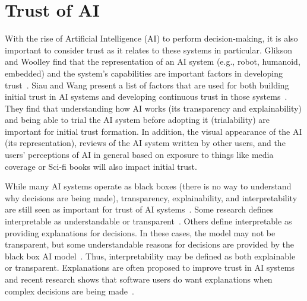 \documentclass{article}
\newcommand{\brendan}[1]{\textcolor{blue}{}}
\begin{document}
\brendan{Are these superficial trust indicators? Trusting brands and interfaces is  the role of the dark arts' of brand/ advertising /sales etc...which is riding a very fine line at teh core of trust and building for example 'trust' in Veracity Lab. This is associated with a level of enquiry/ authenticity and vulnerability/ exposure to truth trust and...authenticity.}

\section{Trust of AI} 
With the rise of Artificial Intelligence (AI) to perform decision-making, it is also important to consider trust as it relates to these systems in particular. Glikson and Woolley find that the representation of an AI system (e.g., robot, humanoid, embedded) and the system's capabilities are important factors in developing trust~\cite{glikson2020human}.
Siau and Wang present a list of factors that are used for both building initial trust in AI systems and developing continuous trust in those systems~\cite{siau2018building}. They find that understanding how AI works (its transparency and explainability) and being able to trial the AI system before adopting it (trialability) are important for initial trust formation. In addition, the visual appearance of the AI (its representation), reviews of the AI system written by other users, and the users' perceptions of AI in general based on exposure to things like media coverage or Sci-fi books will also impact initial trust. 

\brendan{Q: Why are sci-fi books etc so dystopian? They nearly all indicate a lack of trust in our own work. Its a kinda double psychology twisted look at ourselves. }

While many AI systems operate as black boxes (there is no way to understand why decisions are being made), transparency, explainability, and interpretability are still seen as important for trust of AI systems~\cite{lipton2018mythos}.  Some research defines interpretable as understandable or transparent~\cite{lou2013accurate}. Others define interpretable as providing explanations for decisions. In these cases, the model may not be transparent, but some understandable reasons for decisions are provided by the black box AI model~\cite{lou2012intelligible}.  Thus, interpretability may be defined as both explainable or transparent.   Explanations are often proposed to improve trust in AI systems~\cite{lim2019these, sadeghi2021cases} and recent research shows that software users do want explanations when complex decisions are being made~\cite{chazette2020explainability}. 
\end{document}
